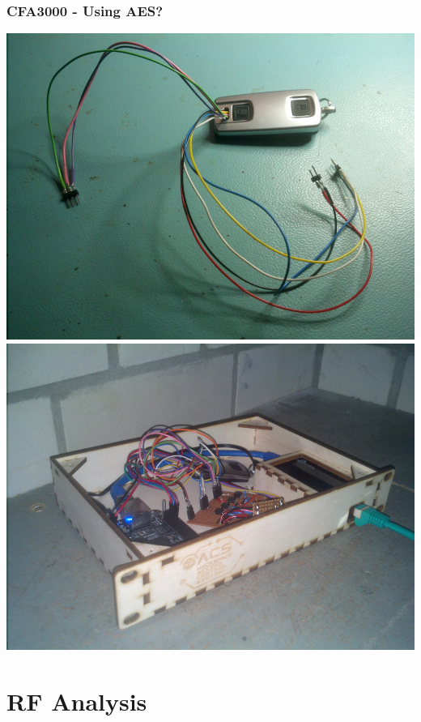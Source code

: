 \documentclass[aspectratio=169]{beamer}
\begin{document}
\begin{frame}
	\frametitle{CFA3000 - Using AES?}

	\begin{center}
		\includegraphics[height=0.55\textheight]{cfa3000-remote-control.jpg}
		\includegraphics[height=0.55\textheight]{cfa3000-rev1.jpg}
	\end{center}
\end{frame}

\section{RF Analysis}
\end{document}

